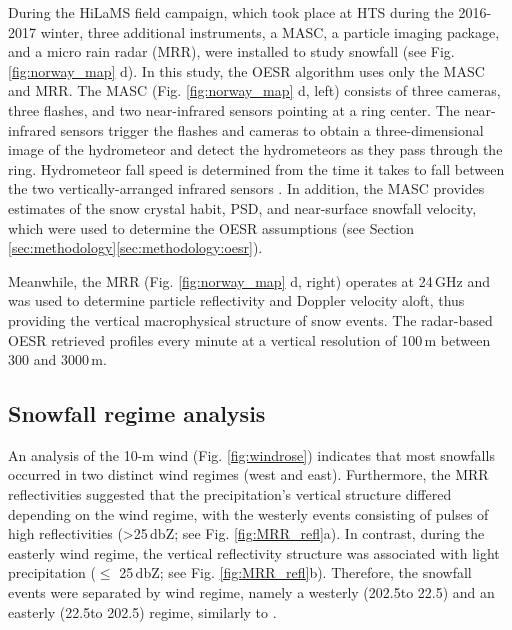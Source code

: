\documentclass{ametsocV5}
\begin{document}
		During the HiLaMS field campaign, which took place at HTS during the 2016-2017 winter, three additional instruments, a MASC, a particle imaging package, and a micro rain radar (MRR), were installed to study snowfall (see Fig. \ref{fig:norway_map} d). In this study, the OESR algorithm uses only the MASC and MRR. The MASC (Fig. \ref{fig:norway_map} d, left) consists of three cameras, three flashes, and two near-infrared sensors pointing at a ring center. The near-infrared sensors trigger the flashes and cameras to obtain a three-dimensional image of the hydrometeor and detect the hydrometeors as they pass through the ring. Hydrometeor fall speed is determined from the time it takes to fall between the two vertically-arranged infrared sensors \citep{garrett_fall_2012}. In addition, the MASC provides estimates of the snow crystal habit, PSD, and near-surface snowfall velocity, which were used to determine the OESR assumptions (see Section \ref{sec:methodology}\ref{sec:methodology:oesr}). 
		
		Meanwhile, the MRR (Fig. \ref{fig:norway_map} d, right) operates at 24\,GHz and was used to determine particle reflectivity and Doppler velocity aloft, thus providing the vertical macrophysical structure of snow events. The radar-based OESR retrieved profiles every minute at a vertical resolution of 100\,m between 300 and 3000\,m. 


	\subsection{Snowfall regime analysis}\label{sec:methodology:snowfall_reg}
		An analysis of the 10-m wind (Fig. \ref{fig:windrose}) indicates that most snowfalls occurred in two distinct wind regimes (west and east). Furthermore, the MRR reflectivities suggested that the precipitation's vertical structure differed depending on the wind regime, with the westerly events consisting of pulses of high reflectivities (\textgreater 25\,dbZ; see Fig. \ref{fig:MRR_refl}a). In contrast, during the easterly wind regime, the vertical reflectivity structure was associated with light precipitation ($\leq$ 25\,dbZ; see Fig. \ref{fig:MRR_refl}b). Therefore, the snowfall events were separated by wind regime, namely a westerly (202.5\textdegree to 22.5\textdegree) and an easterly (22.5\textdegree to 202.5\textdegree) regime, similarly to \citet{schirle_estimation_2019}. 
\end{document}
